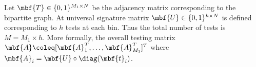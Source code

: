 \documentclass[conference,twocolumn]{IEEEtran}
\begin{document}
 Let $\mbf{T}\in\{0,1\}^{M_1\times N }$ be the adjacency matrix corresponding to the bipartite graph. At universal signature matrix $\mbf{U}\in\{0,1\}^{h\times N}$ is defined corresponding to $h$ tests at each bin. Thus the total number of tests is $M=M_1\times h$. More formally, the overall testing matrix $\mbf{A}\coleq [\mbf{A}_{1}^{T},\ldots,\mbf{A}_{M_{1}}^{T}]^T$ where $\mbf{A}_{i}=\mbf{U}\circ \diag (\mbf{t}_i)$.
\end{document}

